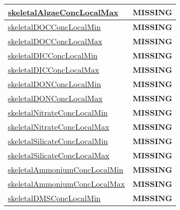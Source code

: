 {\begin{center}
\begin{longtable}{| p{2.0in} | p{4.0in} |}
    \hline
    \hyperref[subsec:var_sec_tracer_monotonicity_skeletalAlgaeConcLocalMax]{skeletalAlgaeConcLocalMax} & {\bf \color{red} MISSING} \\
    \hline
    \hyperref[subsec:var_sec_tracer_monotonicity_skeletalDOCConcLocalMin]{skeletalDOCConcLocalMin} & {\bf \color{red} MISSING} \\
    \hline
    \hyperref[subsec:var_sec_tracer_monotonicity_skeletalDOCConcLocalMax]{skeletalDOCConcLocalMax} & {\bf \color{red} MISSING} \\
    \hline
    \hyperref[subsec:var_sec_tracer_monotonicity_skeletalDICConcLocalMin]{skeletalDICConcLocalMin} & {\bf \color{red} MISSING} \\
    \hline
    \hyperref[subsec:var_sec_tracer_monotonicity_skeletalDICConcLocalMax]{skeletalDICConcLocalMax} & {\bf \color{red} MISSING} \\
    \hline
    \hyperref[subsec:var_sec_tracer_monotonicity_skeletalDONConcLocalMin]{skeletalDONConcLocalMin} & {\bf \color{red} MISSING} \\
    \hline
    \hyperref[subsec:var_sec_tracer_monotonicity_skeletalDONConcLocalMax]{skeletalDONConcLocalMax} & {\bf \color{red} MISSING} \\
    \hline
    \hyperref[subsec:var_sec_tracer_monotonicity_skeletalNitrateConcLocalMin]{skeletalNitrateConcLocalMin} & {\bf \color{red} MISSING} \\
    \hline
    \hyperref[subsec:var_sec_tracer_monotonicity_skeletalNitrateConcLocalMax]{skeletalNitrateConcLocalMax} & {\bf \color{red} MISSING} \\
    \hline
    \hyperref[subsec:var_sec_tracer_monotonicity_skeletalSilicateConcLocalMin]{skeletalSilicateConcLocalMin} & {\bf \color{red} MISSING} \\
    \hline
    \hyperref[subsec:var_sec_tracer_monotonicity_skeletalSilicateConcLocalMax]{skeletalSilicateConcLocalMax} & {\bf \color{red} MISSING} \\
    \hline
    \hyperref[subsec:var_sec_tracer_monotonicity_skeletalAmmoniumConcLocalMin]{skeletalAmmoniumConcLocalMin} & {\bf \color{red} MISSING} \\
    \hline
    \hyperref[subsec:var_sec_tracer_monotonicity_skeletalAmmoniumConcLocalMax]{skeletalAmmoniumConcLocalMax} & {\bf \color{red} MISSING} \\
    \hline
    \hyperref[subsec:var_sec_tracer_monotonicity_skeletalDMSConcLocalMin]{skeletalDMSConcLocalMin} & {\bf \color{red} MISSING} \\
    \hline

\end{longtable}
\end{center}}
